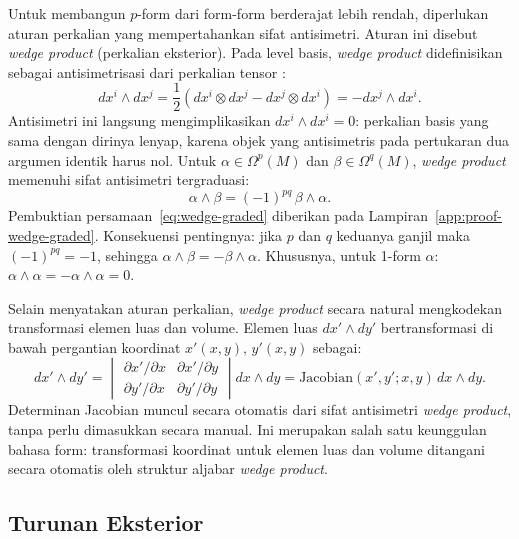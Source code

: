Untuk membangun $p$-form dari form-form berderajat lebih rendah, diperlukan aturan perkalian yang mempertahankan sifat antisimetri. Aturan ini disebut \textit{wedge product} (perkalian eksterior). Pada level basis, \textit{wedge product} didefinisikan sebagai antisimetrisasi dari perkalian tensor \cite{eguchi1980}:
\begin{equation}\label{eq:wedge-def}
    dx^i \wedge dx^j = \frac{1}{2}(dx^i \otimes dx^j - dx^j \otimes dx^i) = -dx^j \wedge dx^i.
\end{equation}
Antisimetri ini langsung mengimplikasikan $dx^i \wedge dx^i = 0$: perkalian basis yang sama dengan dirinya lenyap, karena objek yang antisimetris pada pertukaran dua argumen identik harus nol. Untuk $\alpha \in \Omega^p(M)$ dan $\beta \in \Omega^q(M)$, \textit{wedge product} memenuhi sifat antisimetri tergraduasi:
\begin{equation}\label{eq:wedge-graded}
    \alpha \wedge \beta = (-1)^{pq}\, \beta \wedge \alpha.
\end{equation}
Pembuktian persamaan~\eqref{eq:wedge-graded} diberikan pada Lampiran~\ref{app:proof-wedge-graded}. Konsekuensi pentingnya: jika $p$ dan $q$ keduanya ganjil maka $(-1)^{pq} = -1$, sehingga $\alpha \wedge \beta = -\beta \wedge \alpha$. Khususnya, untuk 1-form $\alpha$: $\alpha \wedge \alpha = -\alpha \wedge \alpha = 0$.

Selain menyatakan aturan perkalian, \textit{wedge product} secara natural mengkodekan transformasi elemen luas dan volume. Elemen luas $dx' \wedge dy'$ bertransformasi di bawah pergantian koordinat $x'(x,y),\, y'(x,y)$ sebagai:
\begin{equation}\label{eq:wedge-jacobian}
    dx' \wedge dy' = \begin{vmatrix} \partial x'/\partial x & \partial x'/\partial y \\ \partial y'/\partial x & \partial y'/\partial y \end{vmatrix} dx \wedge dy = \mathrm{Jacobian}(x', y'; x, y)\, dx \wedge dy.
\end{equation}
Determinan Jacobian muncul secara otomatis dari sifat antisimetri \textit{wedge product}, tanpa perlu dimasukkan secara manual. Ini merupakan salah satu keunggulan bahasa form: transformasi koordinat untuk elemen luas dan volume ditangani secara otomatis oleh struktur aljabar \textit{wedge product}.

\subsection{Turunan Eksterior}
\label{subsec:ext-deriv}

